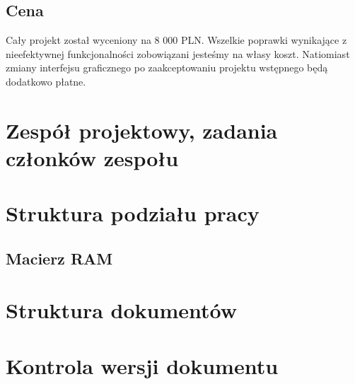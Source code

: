 \documentclass[10pt,a4paper]{article}
\begin{document}
\subsection{Cena}
Cały projekt został wyceniony na 8 000 PLN. Wszelkie poprawki wynikające z nieefektywnej funkcjonalności zobowiązani jesteśmy na własy koszt. Natiomiast zmiany interfejsu graficznego po zaakceptowaniu projektu wstępnego będą dodatkowo płatne.
\section{Zespół projektowy, zadania członków zespołu}

\section{Struktura podziału pracy}
\subsection{Macierz RAM}

\section{Struktura dokumentów}

\section{Kontrola wersji dokumentu}
\end{document}
